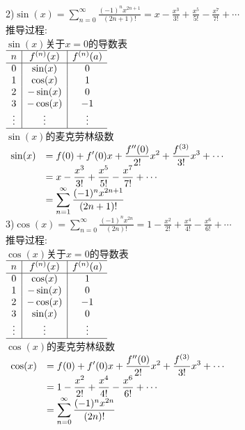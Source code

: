 2)\quad$\displaystyle\sin(x)=\sum_{n=0}^{\infty}\frac{(-1)^nx^{2n+1}}{(2n+1)!}=x-\frac{x^3}{3!}+\frac{x^5}{5!}-\frac{x^7}{7!}+\cdots$\\[1ex]
推导过程:\\
$\sin(x)$关于$x=0$的导数表\\[1ex]
$\begin{array}{c|c|c}
\hline
n & f^{(n)}(x) & f^{(n)}(a)\\
\hline
0 & \sin(x) & 0\\
1 & \cos(x) & 1\\
2 & -\sin(x) & 0\\
3 & -\cos(x) & -1\\
\vdots & \vdots & \vdots\\
\hline
\end{array}$\\[1ex]
$\sin(x)$的麦克劳林级数\\
$\begin{array}{>{\displaystyle}r >{\displaystyle}l}
\sin(x) & =f(0)+f'(0)x+\frac{f''(0)}{2!}x^2+\frac{f^{(3)}}{3!}x^3+\cdots\\
& =x-\frac{x^3}{3!}+\frac{x^5}{5!}-\frac{x^7}{7!}+\cdots\\
& =\sum_{n=1}^{\infty}\frac{(-1)^nx^{2n+1}}{(2n+1)!}
\end{array}$\\[1ex]

3)\quad$\displaystyle\cos(x)=\sum_{n=0}^{\infty}\frac{(-1)^nx^{2n}}{(2n)!}=1-\frac{x^2}{2!}+\frac{x^4}{4!}-\frac{x^6}{6!}+\cdots$\\[1ex]
推导过程:\\
$\cos(x)$关于$x=0$的导数表\\[1ex]
$\begin{array}{c|c|c}
\hline
n & f^{(n)}(x) & f^{(n)}(a)\\
\hline
0 & \cos(x) & 1\\
1 & -\sin(x) & 0\\
2 & -\cos(x) & -1\\
3 & \sin(x) & 0\\
\vdots & \vdots & \vdots\\
\hline
\end{array}$\\[1ex]
$\cos(x)$的麦克劳林级数\\
$\begin{array}{>{\displaystyle}r >{\displaystyle}l}
\cos(x) & =f(0)+f'(0)x+\frac{f''(0)}{2!}x^2+\frac{f^{(3)}}{3!}x^3+\cdots\\
& =1-\frac{x^2}{2!}+\frac{x^4}{4!}-\frac{x^6}{6!}+\cdots\\
& =\sum_{n=0}^{\infty}\frac{(-1)^nx^{2n}}{(2n)!}
\end{array}$\\[1ex]

